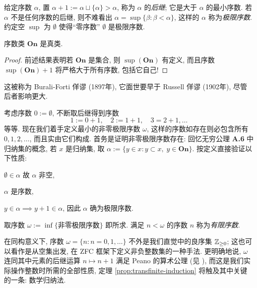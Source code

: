 给定序数 $\alpha$, 置 $\alpha + 1 := \alpha \sqcup \{\alpha\} > \alpha$, 称为 $\alpha$ 的\emph{后继}; 它是大于 $\alpha$ 的最小序数. 若 $\alpha$ 不是任何序数的后继, 则不难看出 $\alpha = \sup\{\beta: \beta < \alpha\}$, 这样的 $\alpha$ 称为\emph{极限序数}. 约定空 $\sup$ 为 $\emptyset$ 使得``零序数'' $\emptyset$ 是极限序数.

\begin{proposition}\label{prop:Ord-class}
	序数类 $\textbf{On}$ 是真类.
\end{proposition}
\begin{proof}
	前述结果表明若 $\textbf{On}$ 是集合, 则 $\sup(\textbf{On})$ 有定义, 而且序数 $\sup(\textbf{On}) + 1$ 将严格大于所有序数, 包括它自己!
\end{proof}
这被称为 Burali-Forti 佯谬 (1897年), 它面世要早于 Russell 佯谬 (1902年), 尽管后者影响更大.

\begin{example} 
	考虑序数 $0 := \emptyset$, 不断取后继得到序数
	\[ 1 := 0 + 1, \quad 2 := 1+1, \quad 3=2+1, \ldots \]
	等等. 现在我们着手定义最小的非零极限序数 $\omega$, 这样的序数如存在则必包含所有 $0,1,2, \ldots$, 而且实由它们构成. 首务是证明非零极限序数存在: 回忆无穷公理 \textbf{A.6} 中归纳集的概念, 若 $x$ 是归纳集, 取 $\alpha := \{y \in x : y \subset x, \; y \in \textbf{On} \}$. 按定义直接验证以下性质:
	\begin{inparaenum}[(a)]
		\item $\emptyset \in \alpha$ 故 $\alpha$ 非空,
		\item $\alpha$ 是序数,
		\item $y \in \alpha \implies y + 1 \in \alpha$, 因此 $\alpha$ 确为极限序数.
	\end{inparaenum}
	取序数 $\omega := \inf\{ \text{非零极限序数} \}$ 即所求. 满足 $n < \omega$ 的序数 $n$ 称为\emph{有限序数}.

	在同构意义下, 序数 $\omega = \{n : n=0, 1, \ldots \}$ 不外是我们直觉中的良序集 $\mathbb{Z}_{\geq 0}$; 这也可以看作是从空集出发, 在 ZFC 框架下定义非负整数集的一种手法. 更明确地说, $\omega$ 连同其中元素的后继运算 $n \mapsto n+1$ 满足 Peano 的算术公理 (见 \cite[第零章, \S 2]{DN00}), 而这是我们实际操作整数时所需的全部性质, 定理 \ref{prop:transfinite-induction} 将触及其中关键的一条: 数学归纳法.
\end{example}

